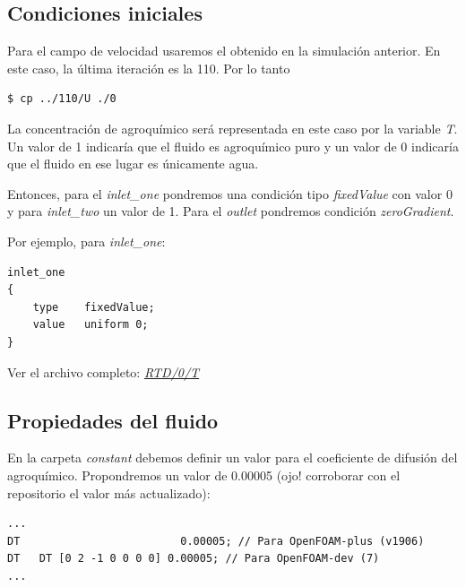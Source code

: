 \documentclass{article}
\begin{document}
\subsection{Condiciones iniciales}
Para el campo de velocidad usaremos el obtenido en la simulación anterior. En este caso, la última iteración es la 110. Por lo tanto

\begin{lstlisting}
$ cp ../110/U ./0
\end{lstlisting}

La concentración de agroquímico será representada en este caso por la variable \textit{T}. Un valor de 1 indicaría que el fluido es agroquímico puro y un valor de 0 indicaría que el fluido en ese lugar es únicamente agua.

Entonces, para el \textit{inlet\_one} pondremos una condición tipo \textit{fixedValue} con valor 0 y para \textit{inlet\_two} un valor de 1. Para el \textit{outlet} pondremos condición \textit{zeroGradient}.

Por ejemplo, para \textit{inlet\_one}:
\begin{lstlisting}
inlet_one 
{
	type	fixedValue;
	value	uniform 0;
}
\end{lstlisting}

Ver el archivo completo: \textit{\href{https://github.com/guillerolle/casos_cfd/blob/master/01/RTD/0/T}{RTD/0/T}}

%

\subsection{Propiedades del fluido}
En la carpeta \textit{constant} debemos definir un valor para el coeficiente de difusión del agroquímico. Propondremos un valor de 0.00005 (ojo! corroborar con el repositorio el valor más actualizado):

\bigskip\bigskip

\begin{lstlisting}
...
DT                         0.00005; // Para OpenFOAM-plus (v1906)
DT   DT [0 2 -1 0 0 0 0] 0.00005; // Para OpenFOAM-dev (7)
...
\end{lstlisting}
\end{document}
